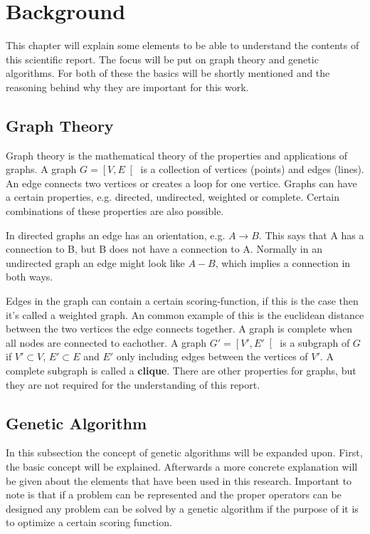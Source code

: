 \section{Background}
\label{chapter:background}
This chapter will explain some elements to be able to understand the contents of this scientific report.
The focus will be put on graph theory and genetic algorithms.
For both of these the basics will be shortly mentioned and the reasoning behind why they are important for this work.

\subsection{Graph Theory}
Graph theory is the mathematical theory of the properties and applications of graphs.
A graph $G=\left[V,E\right[$ is a collection of vertices (points) and edges (lines).
An edge connects two vertices or creates a loop for one vertice.
Graphs can have a certain properties, e.g. directed, undirected, weighted or complete.
Certain combinations of these properties are also possible.

In directed graphs an edge has an orientation, e.g. $A \rightarrow B$. This says that A has a connection to B, but B does not have a connection to A.
Normally in an undirected graph an edge might look like $A - B$, which implies a connection in both ways.

Edges in the graph can contain a certain scoring-function, if this is the case then it's called a weighted graph.
An common example of this is the euclidean distance between the two vertices the edge connects together.
A graph is complete when all nodes are connected to eachother.
A graph $G'=\left[V',E'\right[$ is a subgraph of $G$ if $V' \subset V$, $E' \subset E$ and $E'$ only including edges between the vertices of $V'$.
A complete subgraph is called a \textbf{clique}.
There are other properties for graphs, but they are not required for the understanding of this report.

\subsection{Genetic Algorithm}
In this subsection the concept of genetic algorithms will be expanded upon. 
First, the basic concept will be explained. 
Afterwards a more concrete explanation will be given about the elements that have been used in this research.
Important to note is that if a problem can be represented and the proper operators can be designed any problem can be solved by a genetic algorithm if the purpose of it is to optimize a certain scoring function.

